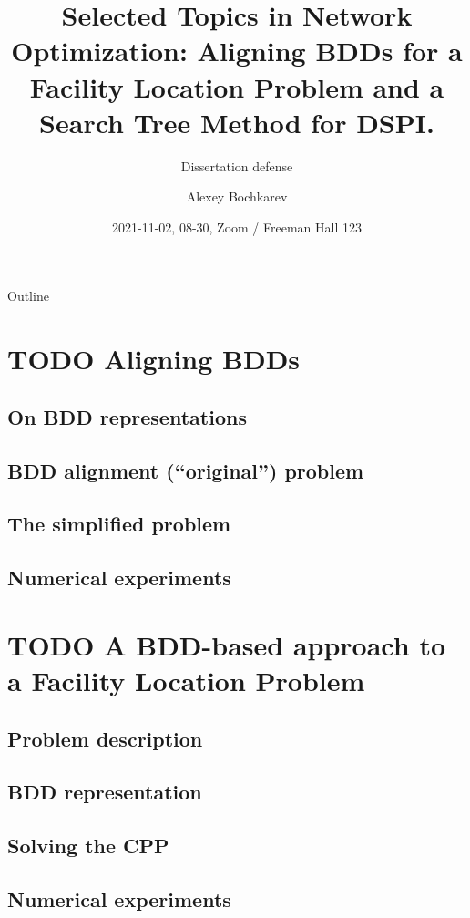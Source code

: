 \documentclass[10pt, xcolor=svgnames]{beamer}
\author{Alexey Bochkarev}
\date{2021-11-02, 08-30, Zoom / Freeman Hall 123}
\title{Selected Topics in Network Optimization: Aligning BDDs for a Facility Location Problem and a Search Tree Method for DSPI.}
\subtitle{Dissertation defense}
\begin{document}
\maketitle
\begin{frame}{Outline}
\tableofcontents
\end{frame}


\section{{\bfseries\sffamily TODO} Aligning BDDs}
\label{sec:orgda14710}
\subsection{On BDD representations}
\label{sec:org39a7528}
\subsection{BDD alignment (``original'') problem}
\label{sec:org32d4f59}
\subsection{The simplified problem}
\label{sec:org2b3a4ed}
\subsection{Numerical experiments}
\label{sec:org27b5420}

\section{{\bfseries\sffamily TODO} A BDD-based approach to a Facility Location Problem}
\label{sec:org04ea660}
\subsection{Problem description}
\label{sec:orge4528b2}
\subsection{BDD representation}
\label{sec:org21b2383}
\subsection{Solving the CPP}
\label{sec:orgcf4bcbf}
\subsection{Numerical experiments}
\label{sec:org5a08bbc}
\end{document}
